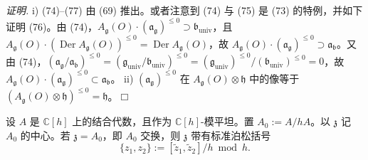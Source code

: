\emph{证明.} i) (74)–(77) 由 (69) 推出。或者注意到 (74) 与 (75) 是 (73) 的特例，并如下证明 (76)。由 (74)，$A_{\mathfrak{g}}(O)\cdot(\mathfrak{a}_{\mathfrak{g}})^{\le0}\supset\mathfrak{b}_{\mathrm{univ}}$，且 $A_{\mathfrak{g}}(O)\cdot(\operatorname{Der}A_{\mathfrak{g}}(O))^{\le0}=\operatorname{Der}A_{\mathfrak{g}}(O)$，故 $A_{\mathfrak{g}}(O)\cdot(\mathfrak{a}_{\mathfrak{g}})^{\le0}\supset\mathfrak{a}_{\mathfrak{b}}$。又由 (74)，$(\mathfrak{a}_{\mathfrak{g}}/\mathfrak{a}_{\mathfrak{b}})^{\le0}=(\mathfrak{g}_{\mathrm{univ}}/\mathfrak{b}_{\mathrm{univ}})^{\le0}=(\mathfrak{g}_{\mathrm{univ}})^{\le0}/(\mathfrak{b}_{\mathrm{univ}})^{\le0}=0$，故 $A_{\mathfrak{g}}(O)\cdot(\mathfrak{a}_{\mathfrak{g}})^{\le0}\subset\mathfrak{a}_{\mathfrak{b}}$。
ii) $(\mathfrak{a}_{\mathfrak{g}})^{\le0}$ 在 $A_{\mathfrak{g}}(O)\otimes\mathfrak{h}$ 中的像等于 $(A_{\mathfrak{g}}(O)\otimes\mathfrak{h})^{\le0}=\mathfrak{h}$。\hfill$\Box$

 设 $A$ 是 $\mathbb{C}[h]$ 上的结合代数，且作为 $\mathbb{C}[h]$-模平坦。置 $A_{0}:=A/hA$。以 $\mathfrak{z}$ 记 $A_{0}$ 的中心。若 $\mathfrak{z}=A_{0}$，即 $A_{0}$ 交换，则 $\mathfrak{z}$ 带有标准泊松括号
\begin{equation}\tag{79}
\{z_{1},z_{2}\}:=[\tilde z_{1},\tilde z_{2}]/h\bmod h.
\end{equation}
